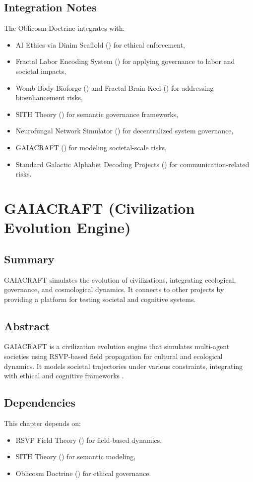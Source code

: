 \documentclass[11pt,oneside]{memoir}
\theoremstyle{plain}
\begin{document}
\section{Integration Notes}
The Oblicosm Doctrine integrates with:
\begin{itemize}
    \item AI Ethics via Dinim Scaffold () for ethical enforcement,
    \item Fractal Labor Encoding System () for applying governance to labor and societal impacts,
    \item Womb Body Bioforge () and Fractal Brain Keel () for addressing bioenhancement risks,
    \item SITH Theory () for semantic governance frameworks,
    \item Neurofungal Network Simulator () for decentralized system governance,
    \item GAIACRAFT () for modeling societal-scale risks,
    \item Standard Galactic Alphabet Decoding Projects () for communication-related risks.
\end{itemize}

\chapter{GAIACRAFT (Civilization Evolution Engine)}
\label{sec:gaiacraft}

\section{Summary}
GAIACRAFT simulates the evolution of civilizations, integrating ecological, governance, and cosmological dynamics. It connects to other projects by providing a platform for testing societal and cognitive systems.

\section{Abstract}
GAIACRAFT is a civilization evolution engine that simulates multi-agent societies using RSVP-based field propagation for cultural and ecological dynamics. It models societal trajectories under various constraints, integrating with ethical and cognitive frameworks \cite{ai_ethics}.

\section{Dependencies}
This chapter depends on:
\begin{itemize}
    \item RSVP Field Theory () for field-based dynamics,
    \item SITH Theory () for semantic modeling,
    \item Oblicosm Doctrine () for ethical governance.
\end{itemize}
\end{document}
